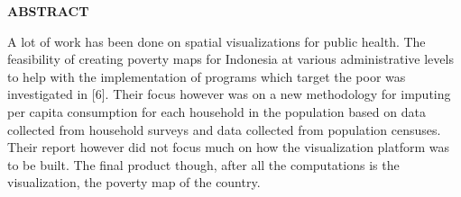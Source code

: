 \cleardoublepage
\begin{center}
{\Large\textbf{ABSTRACT}}
\end{center}
\renewcommand{\baselinestretch}{1.50}\normalsize
A lot of work has been done on spatial visualizations for public health.  The feasibility of creating poverty maps for Indonesia at various administrative levels to help with the implementation of programs which target the poor was investigated in [6]. Their focus however was on a new methodology for imputing per capita consumption for each household in the population based on data collected from household surveys and data collected from population censuses. Their report however did not focus much on how the visualization platform was to be built. The final product though, after all the computations is the visualization, the poverty map of the country. 



